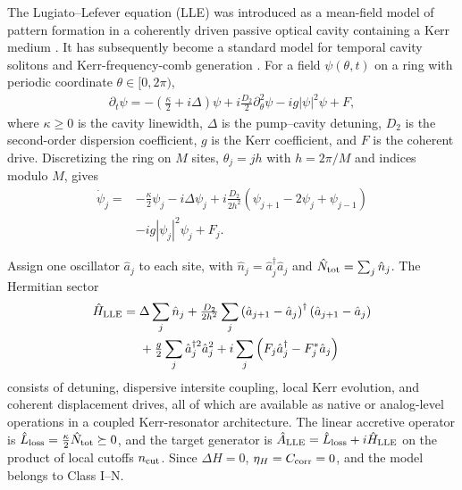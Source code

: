 \documentclass[pra,twocolumn,superscriptaddress,nofootinbib,floatfix]{revtex4-2}
\theoremstyle{remark}
\begin{document}
The Lugiato--Lefever equation (LLE) was introduced as a mean-field model of pattern formation in a coherently driven passive optical cavity containing a Kerr medium \cite{PhysRevLett.58.2209}. It has subsequently become a standard model for temporal cavity solitons and Kerr-frequency-comb generation \cite{Coen_2013,PhysRevLett.113.123901}. For a field $\psi(\theta,t)$ on a ring with periodic coordinate $\theta\in[0,2\pi)$,
\begin{align}
\partial_t\psi=-\left(\tfrac{\kappa}{2}+i\Delta\right)\psi+i\tfrac{D_2}{2}\partial_{\theta}^{2}\psi-ig|\psi|^2\psi+F,
\label{eq:lle-continuum}
\end{align}
where $\kappa\ge0$ is the cavity linewidth, $\Delta$ is the pump--cavity detuning, $D_2$ is the second-order dispersion coefficient, $g$ is the Kerr coefficient, and $F$ is the coherent drive. Discretizing the ring on $M$ sites, $\theta_j=jh$ with $h=2\pi/M$ and indices modulo $M$, gives
\begin{align}
\dot\psi_j={}&-\tfrac{\kappa}{2}\psi_j-i\Delta\psi_j+i\tfrac{D_2}{2h^2}\left(\psi_{j+1}-2\psi_j+\psi_{j-1}\right)\nonumber\\
&-ig|\psi_j|^2\psi_j+F_j .
\label{eq:lle-discrete}
\end{align}

Assign one oscillator \(\hat a_j\) to each site, with $\hat n_j=\hat a_j^\dagger\hat a_j$ and $\hat N_{\rm tot}=\sum_j\hat n_j$. The Hermitian sector
\begin{align}
\hat H_{\rm LLE}={}&\Delta\sum_j\hat n_j+\tfrac{D_2}{2h^2}\sum_j\left(\hat a_{j+1}-\hat a_j\right)^\dagger\left(\hat a_{j+1}-\hat a_j\right)\nonumber\\
&+\tfrac{g}{2}\sum_j\hat a_j^{\dagger 2}\hat a_j^2+i\sum_j\left(F_j\hat a_j^\dagger-F_j^*\hat a_j\right)
\label{eq:lle-native-hamiltonian}
\end{align}
consists of detuning, dispersive intersite coupling, local Kerr evolution, and coherent displacement drives, all of which are available as native or analog-level operations in a coupled Kerr-resonator architecture. The linear accretive operator is \(\hat L_{\rm loss}=\tfrac{\kappa}{2}\hat N_{\rm tot}\succeq0\), and the target generator is \(\hat A_{\rm LLE}=\hat L_{\rm loss}+i\hat H_{\rm LLE}\) on the product of local cutoffs \(n_{\rm cut}\). Since \(\Delta H=0\), \(\eta_H=C_{\rm corr}=0\), and the model belongs to Class I--N.
\end{document}
